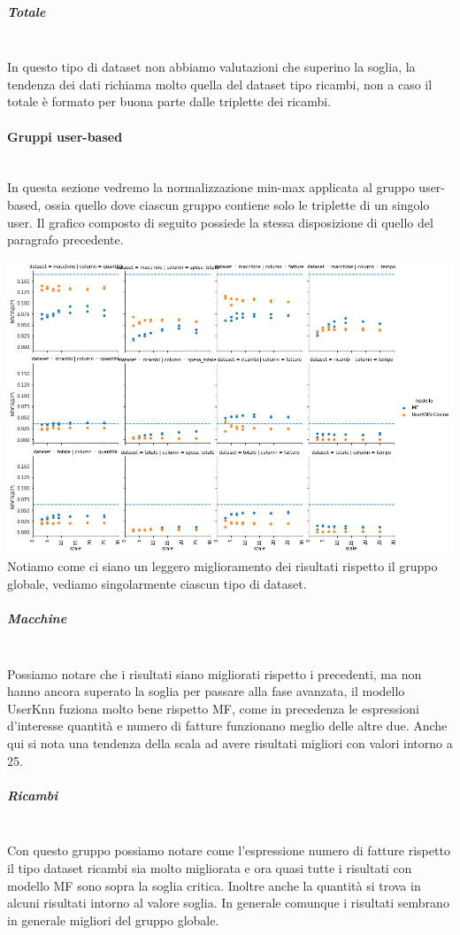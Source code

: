 \subparagraph{Totale}\mbox{} \\
In questo tipo di dataset non abbiamo valutazioni che superino la soglia, la tendenza dei dati richiama molto quella del dataset tipo ricambi, non a caso il totale è formato per buona parte dalle triplette dei ricambi. 

\paragraph{Gruppi user-based}\mbox{} \\
In questa sezione vedremo la normalizzazione min-max applicata al gruppo user-based, ossia quello dove ciascun gruppo contiene solo le triplette di un singolo user. Il grafico composto di seguito possiede la stessa disposizione di quello del paragrafo precedente.

\includegraphics[width=16cm]{figures/risultati_minmax_singolo.png}
Notiamo come ci siano un leggero miglioramento dei risultati rispetto il gruppo globale, vediamo singolarmente ciascun tipo di dataset.

\subparagraph{Macchine}\mbox{} \\
Possiamo notare che i risultati siano migliorati rispetto i precedenti, ma non hanno ancora superato la soglia per passare alla fase avanzata, il modello UserKnn fuziona molto bene rispetto MF, come in precedenza le espressioni d'interesse quantità e numero di fatture funzionano meglio delle altre due. Anche qui si nota una tendenza della scala ad avere risultati migliori con valori intorno a 25. 

\subparagraph{Ricambi}\mbox{} \\
Con questo gruppo possiamo notare come l'espressione numero di fatture rispetto il tipo dataset ricambi sia molto migliorata e ora quasi tutte i risultati con modello MF sono sopra la soglia critica. Inoltre anche la quantità si trova in alcuni risultati intorno al valore soglia. In generale comunque i risultati sembrano in generale migliori del gruppo globale.

